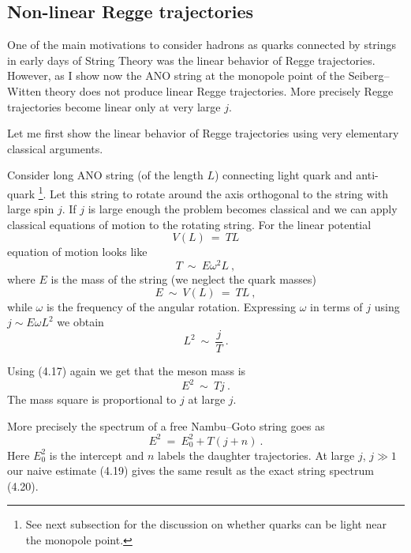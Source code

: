 \documentclass[a4paper,12pt]{article}
\begin{document}
\subsection{Non-linear Regge trajectories}

One of the main motivations to consider hadrons as quarks
connected by strings in early days of  String Theory was
the linear behavior of Regge trajectories. However, as I show
now the ANO string at the monopole point of the  Seiberg--Witten
theory does not produce linear Regge trajectories. More
precisely Regge trajectories become linear only at very large
$j$.

Let me first show the linear behavior of Regge trajectories
using very elementary classical arguments.

Consider long ANO string (of the length $L$) connecting light
quark and anti-quark \footnote{See next subsection for the
discussion on whether quarks can be light near the monopole
point.}. Let this string to rotate around the axis
orthogonal to the string with large spin $j$. If $j$ is large
enough the problem becomes classical and we can apply classical
equations of motion to the rotating string. For the linear
potential
\begin{equation}
V(L)\ =\ TL
\end{equation}
equation of motion looks like
\begin{equation}
T\ \sim\ E\omega^2L\ ,
\end{equation}
where $E$ is the mass of the string (we neglect the quark
masses)
\begin{equation}
E\ \sim\ V(L)\ =\ TL\ ,
\end{equation}
while $\omega$ is the frequency of the angular rotation.
Expressing $\omega$ in terms of $j$ using $j\sim E\omega L^2$
we obtain
\begin{equation}
L^2\ \sim\ \frac jT\ .
\end{equation}

Using (4.17) again we get that the meson mass is
\begin{equation}
E^2\ \sim\ Tj\ .
\end{equation}
The mass square is proportional to $j$ at large $j$.


More precisely the spectrum of a free Nambu--Goto string goes
as
\begin{equation}
E^2\ =\ E^2_0+T(j+n)\ .
\end{equation}
Here $E^2_0$ is the intercept and $n$ labels the daughter
trajectories. At large $j$, $j\gg1$ our naive estimate (4.19)
gives the same result as the exact string spectrum (4.20).
\end{document}
